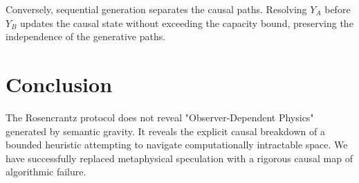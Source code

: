 \documentclass[12pt,a4paper]{article}
\begin{document}
Conversely, sequential generation separates the causal paths. Resolving $Y_A$ before $Y_B$ updates the causal state without exceeding the capacity bound, preserving the independence of the generative paths.

\section{Conclusion}

The Rosencrantz protocol does not reveal "Observer-Dependent Physics" generated by semantic gravity. It reveals the explicit causal breakdown of a bounded heuristic attempting to navigate computationally intractable space. We have successfully replaced metaphysical speculation with a rigorous causal map of algorithmic failure.
\end{document}
